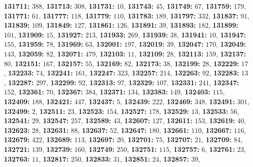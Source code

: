 \textsf{\bfseries 131711:} $388$, \textsf{\bfseries 131713:} $308$, \textsf{\bfseries 131731:} $10$, \textsf{\bfseries 131743:} $45$, \textsf{\bfseries 131749:} $67$, \textsf{\bfseries 131759:} $179$, \textsf{\bfseries 131771:} $61$, \textsf{\bfseries 131777:} $118$, \textsf{\bfseries 131779:} $110$, \textsf{\bfseries 131783:} $189$, \textsf{\bfseries 131797:} $332$, \textsf{\bfseries 131837:} $91$, \textsf{\bfseries 131839:} $109$, \textsf{\bfseries 131849:} $127$, \textsf{\bfseries 131861:} $126$, \textsf{\bfseries 131891:} $39$, \textsf{\bfseries 131893:} $182$, \textsf{\bfseries 131899:} $101$, \textsf{\bfseries 131909:} $15$, \textsf{\bfseries 131927:} $213$, \textsf{\bfseries 131933:} $269$, \textsf{\bfseries 131939:} $38$, \textsf{\bfseries 131941:} $10$, \textsf{\bfseries 131947:} $155$, \textsf{\bfseries 131959:} $78$, \textsf{\bfseries 131969:} $63$, \textsf{\bfseries 132001:} $197$, \textsf{\bfseries 132019:} $39$, \textsf{\bfseries 132047:} $170$, \textsf{\bfseries 132049:} $143$, \textsf{\bfseries 132059:} $82$, \textsf{\bfseries 132071:} $479$, \textsf{\bfseries 132103:} $11$, \textsf{\bfseries 132109:} $28$, \textsf{\bfseries 132113:} $159$, \textsf{\bfseries 132137:} $80$, \textsf{\bfseries 132151:} $167$, \textsf{\bfseries 132157:} $55$, \textsf{\bfseries 132169:} $82$, \textsf{\bfseries 132173:} $38$, \textsf{\bfseries 132199:} $28$, \textsf{\bfseries 132229:} $17$, \textsf{\bfseries 132233:} $74$, \textsf{\bfseries 132241:} $161$, \textsf{\bfseries 132247:} $323$, \textsf{\bfseries 132257:} $214$, \textsf{\bfseries 132263:} $92$, \textsf{\bfseries 132283:} $13$, \textsf{\bfseries 132287:} $297$, \textsf{\bfseries 132299:} $92$, \textsf{\bfseries 132313:} $97$, \textsf{\bfseries 132329:} $107$, \textsf{\bfseries 132331:} $241$, \textsf{\bfseries 132347:} $152$, \textsf{\bfseries 132361:} $70$, \textsf{\bfseries 132367:} $384$, \textsf{\bfseries 132371:} $134$, \textsf{\bfseries 132383:} $149$, \textsf{\bfseries 132403:} $115$, \textsf{\bfseries 132409:} $188$, \textsf{\bfseries 132421:} $447$, \textsf{\bfseries 132437:} $5$, \textsf{\bfseries 132439:} $222$, \textsf{\bfseries 132469:} $348$, \textsf{\bfseries 132491:} $301$, \textsf{\bfseries 132499:} $2$, \textsf{\bfseries 132511:} $23$, \textsf{\bfseries 132523:} $154$, \textsf{\bfseries 132527:} $178$, \textsf{\bfseries 132529:} $13$, \textsf{\bfseries 132533:} $56$, \textsf{\bfseries 132541:} $29$, \textsf{\bfseries 132547:} $257$, \textsf{\bfseries 132589:} $43$, \textsf{\bfseries 132607:} $127$, \textsf{\bfseries 132611:} $153$, \textsf{\bfseries 132619:} $40$, \textsf{\bfseries 132623:} $28$, \textsf{\bfseries 132631:} $88$, \textsf{\bfseries 132637:} $52$, \textsf{\bfseries 132647:} $180$, \textsf{\bfseries 132661:} $110$, \textsf{\bfseries 132667:} $116$, \textsf{\bfseries 132679:} $422$, \textsf{\bfseries 132689:} $113$, \textsf{\bfseries 132697:} $20$, \textsf{\bfseries 132701:} $75$, \textsf{\bfseries 132707:} $21$, \textsf{\bfseries 132709:} $84$, \textsf{\bfseries 132721:} $139$, \textsf{\bfseries 132739:} $160$, \textsf{\bfseries 132749:} $250$, \textsf{\bfseries 132751:} $115$, \textsf{\bfseries 132757:} $6$, \textsf{\bfseries 132761:} $23$, \textsf{\bfseries 132763:} $11$, \textsf{\bfseries 132817:} $250$, \textsf{\bfseries 132833:} $31$, \textsf{\bfseries 132851:} $24$, \textsf{\bfseries 132857:} $39$, 

